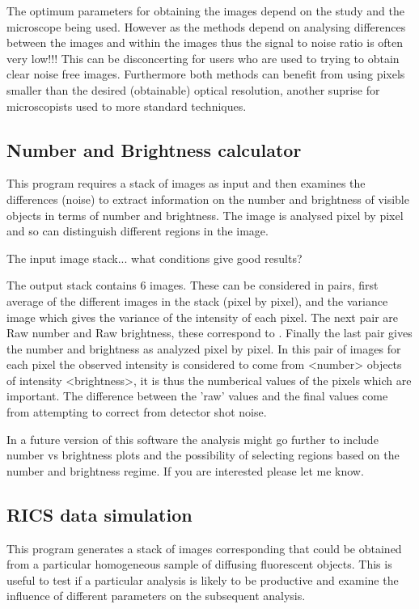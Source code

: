 \documentclass[10pt]{article}
\begin{document}
The optimum parameters for obtaining the images depend on the study 
and the microscope being used. However as the methods depend on analysing 
differences between the images and within the images thus the signal to noise ratio 
is often very low!!! This can be disconcerting for users who are used to trying to
obtain clear noise free images. Furthermore both methods can benefit from using
pixels smaller than the desired (obtainable) optical resolution, another suprise
for microscopists used to more standard techniques.

\subsection{Number and Brightness calculator}

This program requires a stack of images as input and then examines the differences
(noise) to extract information on the number and brightness of visible objects
in terms of number and brightness. The image is analysed pixel by pixel and so 
can distinguish different regions in the image.

The input image stack... what conditions give good results?

The output stack contains 6 images. These can be considered in pairs, first average 
of the different images in the stack (pixel by pixel), and the variance image 
which gives the variance of the intensity of each pixel. The next pair are Raw 
number and Raw brightness, these correspond to . Finally the last pair gives the 
number and brightness as analyzed pixel by pixel. In this pair of images for 
each pixel the observed intensity is considered to come from <number> objects of 
intensity <brightness>, it is thus the numberical values of the pixels which are 
important. The difference between the 'raw' values and the final values come from 
attempting to correct from detector shot noise.

In a future version of this software the analysis might go further to include
number vs brightness plots and the possibility of selecting regions based on the
number and brightness regime. If you are interested please let me know.

\subsection{RICS data simulation}

This program generates a stack of images corresponding that could be obtained 
from a particular homogeneous sample of diffusing fluorescent objects. This is 
useful to test if a particular analysis is likely to be productive and examine 
the influence of different parameters on the subsequent analysis.
\end{document}
